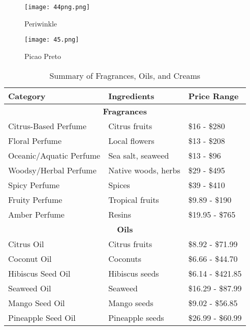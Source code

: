 \documentclass{article}
\begin{document}
\begin{itemize}
\begin{figure}[H]
\centering
\begin{minipage}{0.5\textwidth}
\texttt{[image: 44png.png]}
\caption{Periwinkle}
\end{minipage}%
\begin{minipage}{0.5\textwidth}
\texttt{[image: 45.png]}
\caption{Picao Preto}
\end{minipage}
\end{figure}

\begin{table}[H]
\centering
\caption{Summary of Fragrances, Oils, and Creams}
\begin{tabular}{@{}lll@{}}
\toprule
\textbf{Category} & \textbf{Ingredients} & \textbf{Price Range} \\ 
\midrule
\multicolumn{3}{c}{\textbf{Fragrances}} \\
\midrule
Citrus-Based Perfume & Citrus fruits & \$16 - \$280 \\
Floral Perfume & Local flowers & \$13 - \$208 \\
Oceanic/Aquatic Perfume & Sea salt, seaweed & \$13 - \$96 \\
Woodsy/Herbal Perfume & Native woods, herbs & \$29 - \$495 \\
Spicy Perfume & Spices & \$39 - \$410 \\
Fruity Perfume & Tropical fruits & \$9.89 - \$190 \\
Amber Perfume & Resins & \$19.95 - \$765 \\

\midrule
\multicolumn{3}{c}{\textbf{Oils}} \\
\midrule
Citrus Oil & Citrus fruits & \$8.92 - \$71.99 \\
Coconut Oil & Coconuts & \$6.66 - \$44.70 \\
Hibiscus Seed Oil & Hibiscus seeds & \$6.14 - \$421.85 \\
Seaweed Oil & Seaweed & \$16.29 - \$87.99 \\
Mango Seed Oil & Mango seeds & \$9.02 - \$56.85 \\
Pineapple Seed Oil & Pineapple seeds & \$26.99 - \$60.99 \\


\end{tabular}
\end{table}
\end{itemize}
\end{document}
